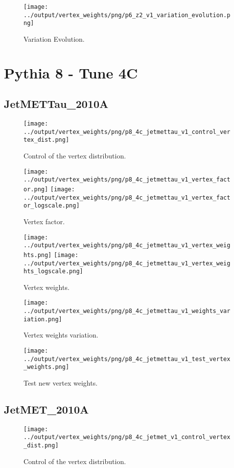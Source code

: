 \documentclass[11pt]{book}
\begin{document}
\begin{figure}[ht]
\centering
\texttt{[image: ../output/vertex\_weights/png/p6\_z2\_v1\_variation\_evolution.png]}
\caption{Variation Evolution.}
\end{figure}
\clearpage

\section{Pythia 8 - Tune 4C}
\subsection{JetMETTau\_2010A}
\begin{figure}[ht]
\centering
\texttt{[image: ../output/vertex\_weights/png/p8\_4c\_jetmettau\_v1\_control\_vertex\_dist.png]}
\caption{Control of the vertex distribution.}
\end{figure}

\begin{figure}[ht]
\centering
\texttt{[image: ../output/vertex\_weights/png/p8\_4c\_jetmettau\_v1\_vertex\_factor.png]}
\texttt{[image: ../output/vertex\_weights/png/p8\_4c\_jetmettau\_v1\_vertex\_factor\_logscale.png]}
\caption{Vertex factor.}
\end{figure}

\begin{figure}[ht]
\centering
\texttt{[image: ../output/vertex\_weights/png/p8\_4c\_jetmettau\_v1\_vertex\_weights.png]}
\texttt{[image: ../output/vertex\_weights/png/p8\_4c\_jetmettau\_v1\_vertex\_weights\_logscale.png]}
\caption{Vertex weights.}
\end{figure}

\begin{figure}[ht]
\centering
\texttt{[image: ../output/vertex\_weights/png/p8\_4c\_jetmettau\_v1\_weights\_variation.png]}
\caption{Vertex weights variation.}
\end{figure}

\begin{figure}[ht]
\centering
\texttt{[image: ../output/vertex\_weights/png/p8\_4c\_jetmettau\_v1\_test\_vertex\_weights.png]}
\caption{Test new vertex weights.}
\end{figure}
\clearpage

\subsection{JetMET\_2010A}
\begin{figure}[ht]
\centering
\texttt{[image: ../output/vertex\_weights/png/p8\_4c\_jetmet\_v1\_control\_vertex\_dist.png]}
\caption{Control of the vertex distribution.}
\end{figure}
\end{document}
